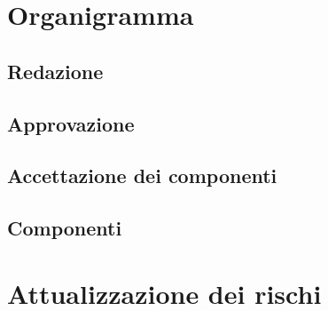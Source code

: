 \appendix

\section{Organigramma} \label{organigramma}
\subsection{Redazione} \label{organigramma_redazione}

\subsection{Approvazione} \label{organigramma_approvazione}

\subsection{Accettazione dei componenti} \label{organigramma_accettazione}

\subsection{Componenti} \label{organigramma_componenti}

\pagebreak


\section{Attualizzazione dei rischi} \label{attualizzazione_dei_rischi}
